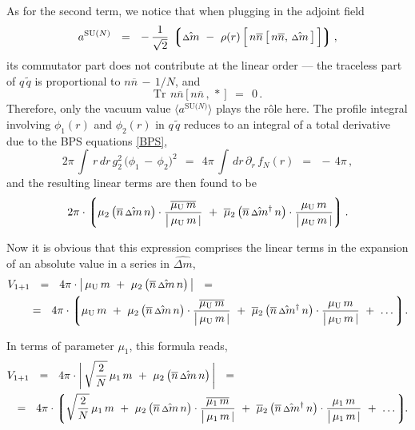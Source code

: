\documentclass[12pt]{article}
\def\beq{\begin{equation}}
\def\eeq{\end{equation}}
\newcommand{\p}{\partial}
\newcommand{\wt}{\widetilde}
\newcommand{\ov}{\overline}
\newcommand{\lgr}{\left\lgroup}
\newcommand{\rgr}{\right\rgroup}
\newcommand{\aN}{a^\text{SU($N$)}}
\newcommand{\nbar}{\ov{n}}
\newcommand{\nnbar}{n\ov{n}}
\newcommand{\muU}{\mu_\text{U}}
\newcommand{\qt}{\wt{q}}
\newcommand{\Tr}{\text{Tr}}
\newcommand{\dm}{\hat{{\scriptstyle \Delta} m}}
\newcommand{\dmdag}{\hat{{\scriptstyle \Delta} m}{}^\dag}
\begin{document}
	As for the second term, we notice that when plugging in the adjoint field 
\[
	\aN    ~~=~~    
	-\, \frac{1}{\sqrt{2}}\, 
	\lgr \dm  ~-~  \rho(r)\, \Big[\, \nnbar\, \big[\, \nnbar,\, \dm \,\big] \,\Big] \rgr,
\]
	its commutator part does not contribute at the linear order --- 
	the traceless part of $ q\, \qt $ is proportional to $ \nnbar \,-\, 1/N $, and
\[
	\Tr~\, \nnbar \, \big[\, \nnbar \,,\, * \,\big]    ~~=~~    0\,.
\]
	Therefore, only the vacuum value $ \langle \aN \rangle $ plays the r\^ole here.
	The profile integral involving $ \phi_1(r) $ and $ \phi_2(r) $ in $ q\, \qt $
	reduces to an integral of a total derivative due to the BPS equations \eqref{BPS},
\[
	2\pi\, \int\, r\, dr\, g_2^2\, \big( \phi_1 \,-\, \phi_2 \big)^2    ~~=~~
	4\pi\, \int\, dr\, \p_r\, f_N(r)    ~~=~~    -\, 4\pi\,,
\] 
	and the resulting linear terms are then found to be 
\beq
	2\pi \cdot 
	\lgr
		\mu_2\, \big(\nbar\, \dm\, n\big) \cdot \frac{\ov{\muU\, m}}{\big|\, \muU\, m \,|}
		~+~
		\ov{\mu}{}_2\, \big(\nbar\, \dmdag\, n\big) \cdot \frac{\muU\, m}{\big|\, \muU\, m \,|}
	\rgr.
\eeq

	Now it is obvious that this expression comprises the linear terms in the expansion of
	an absolute value in a series in $ \dm $,
\begin{align}
%
	&
	V_{1+1}    ~~=~~    4 \pi \cdot \big|\, \muU\, m  ~+~  \mu_2\, \big(\nbar\, \dm\, n\big) \,\big|    ~~=~~    
	\\
%
\notag
	&
	\quad~
	~~=~~
	4 \pi \cdot 
	\lgr
		\muU\, m  
		~+~
		\mu_2\, \big(\nbar\, \dm\, n\big) \cdot \frac{\ov{\muU\, m}}{\big|\, \muU\, m \,|}
		~+~
		\ov{\mu}{}_2\, \big(\nbar\, \dmdag\, n\big) \cdot \frac{\muU\, m}{\big|\, \muU\, m \,|}
		~+~
		\dots
	\rgr\!.
\end{align}

	In terms of parameter $ \mu_1 $, this formula reads,
\begin{align}
%
	&
	V_{1+1}    ~~=~~    4 \pi \cdot \bigg|\, \sqrt{\frac{2}{N}}\,\mu_1\, m  ~+~  \mu_2\, \big(\nbar\, \dm\, n\big) \,\bigg|    ~~=~~    
	\\
%
\notag
	&
	~~=~~
	4 \pi \cdot 
	\lgr
		\sqrt{\frac{2}{N}}\,\mu_1\, m  
		~+~
		\mu_2\, \big(\nbar\, \dm\, n\big) \cdot \frac{\ov{\mu_1\, m}}{\big|\, \mu_1\, m \,|}
		~+~
		\ov{\mu}{}_2\, \big(\nbar\, \dmdag\, n\big) \cdot \frac{\mu_1\, m}{\big|\, \mu_1\, m \,|}
		~+~
		\dots
	\rgr\!\!.
\end{align}
\end{document}
